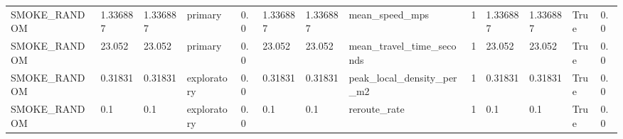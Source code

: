 \begin{tabular}{lllllllllllll}
SMOKE\_RANDOM & 1.336887 & 1.336887 & primary & 0.0 & 1.336887 & 1.336887 & mean\_speed\_mps & 1 & 1.336887 & 1.336887 & True & 0.0 \\
SMOKE\_RANDOM & 23.052 & 23.052 & primary & 0.0 & 23.052 & 23.052 & mean\_travel\_time\_seconds & 1 & 23.052 & 23.052 & True & 0.0 \\
SMOKE\_RANDOM & 0.31831 & 0.31831 & exploratory & 0.0 & 0.31831 & 0.31831 & peak\_local\_density\_per\_m2 & 1 & 0.31831 & 0.31831 & True & 0.0 \\
SMOKE\_RANDOM & 0.1 & 0.1 & exploratory & 0.0 & 0.1 & 0.1 & reroute\_rate & 1 & 0.1 & 0.1 & True & 0.0 \\
\hline
\end{tabular}
